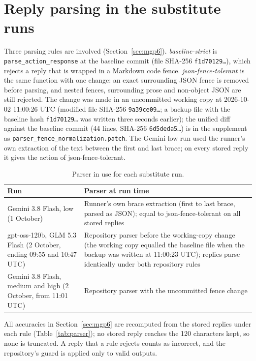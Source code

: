 \section{Reply parsing in the substitute runs}
\label{app:parser}
Three parsing rules are involved (Section~\ref{sec:mgp6}). \emph{baseline-strict} is \texttt{parse\_action\_response} at the baseline commit (file SHA-256 \texttt{f1d70129\ldots}), which rejects a reply that is wrapped in a Markdown code fence. \emph{json-fence-tolerant} is the same function with one change: an exact surrounding JSON fence is removed before parsing, and nested fences, surrounding prose and non-object JSON are still rejected. The change was made in an uncommitted working copy at 2026-10-02 11:00:26 UTC (modified file SHA-256 \texttt{9a39ce09\ldots}; a backup file with the baseline hash \texttt{f1d70129\ldots} was written three seconds earlier); the unified diff against the baseline commit (44 lines, SHA-256 \texttt{6d5deda5\ldots}) is in the supplement as \texttt{parser\_fence\_normalization.patch}. The Gemini low run used the runner's own extraction of the text between the first and last brace; on every stored reply it gives the action of json-fence-tolerant.

\begin{table}[h]
\centering\small
\caption{Parser in use for each substitute run.}
\begin{tabularx}{\linewidth}{lX}
\toprule
Run & Parser at run time \\
\midrule
Gemini 3.8 Flash, low (1 October) & Runner's own brace extraction (first to last brace, parsed as JSON); equal to json-fence-tolerant on all stored replies \\
gpt-oss-120b, GLM 5.3 Flash (2 October, ending 09:55 and 10:47 UTC) & Repository parser before the working-copy change (the working copy equalled the baseline file when the backup was written at 11:00:23 UTC); replies parse identically under both repository rules \\
Gemini 3.8 Flash, medium and high (2 October, from 11:01 UTC) & Repository parser with the uncommitted fence change \\
\bottomrule
\end{tabularx}
\end{table}

All accuracies in Section~\ref{sec:mgp6} are recomputed from the stored replies under each rule (Table~\ref{tab:parser}); no stored reply reaches the 120 characters kept, so none is truncated. A reply that a rule rejects counts as incorrect, and the repository's guard is applied only to valid \abstain{} outputs.

